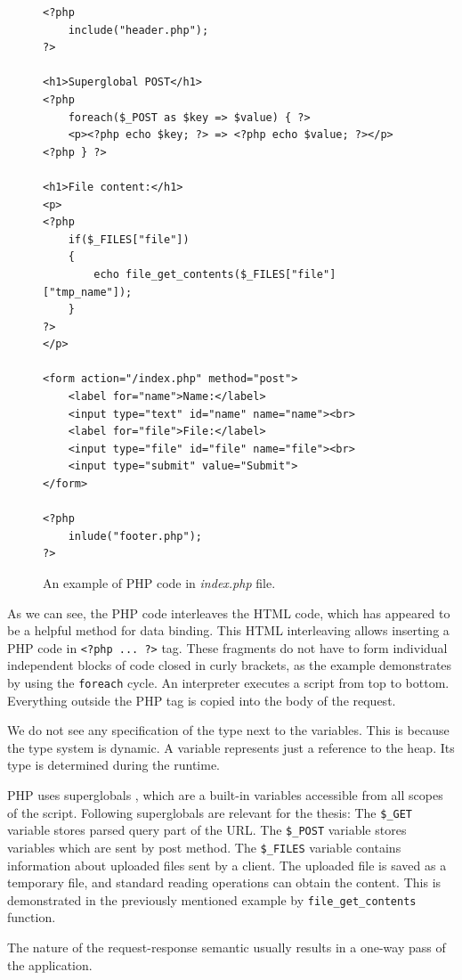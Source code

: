 \begin{figure}
\begin{lstlisting}
<?php
    include("header.php");
?>

<h1>Superglobal POST</h1>
<?php
    foreach($_POST as $key => $value) { ?>
    <p><?php echo $key; ?> => <?php echo $value; ?></p>
<?php } ?>

<h1>File content:</h1>
<p>
<?php 
    if($_FILES["file"])
    {
        echo file_get_contents($_FILES["file"]["tmp_name"]);
    }	
?>
</p>

<form action="/index.php" method="post">
    <label for="name">Name:</label>
    <input type="text" id="name" name="name"><br>
    <label for="file">File:</label>
    <input type="file" id="file" name="file"><br>
    <input type="submit" value="Submit">
</form>

<?php
    inlude("footer.php");
?>
\end{lstlisting}
\caption{An example of PHP code in \textit{index.php} file.}
\label{img01:php}
\end{figure}
\par
As we can see, the PHP code interleaves the HTML code, which has appeared to be a helpful method for data binding.
This HTML interleaving allows inserting a PHP code in \texttt{<?php ... ?>} tag.
These fragments do not have to form individual independent blocks of code closed in curly brackets, as the example demonstrates by using the \texttt{foreach} cycle.
An interpreter executes a script from top to bottom. Everything outside the PHP tag is copied into the body of the request.
\par
We do not see any specification of the type next to the variables.
This is because the type system is dynamic.
A variable represents just a reference to the heap.
Its type is determined during the runtime. 
\par
PHP uses superglobals \cite{online:phpManual}, which are a built-in variables accessible from all scopes of the script.
Following superglobals are relevant for the thesis:
The \texttt{\$\_GET} variable stores parsed query part of the URL.
The \texttt{\$\_POST} variable stores variables which are sent by post method.
The \texttt{\$\_FILES} variable contains information about uploaded files sent by a client.
The uploaded file is saved as a temporary file, and standard reading operations can obtain the content.
This is demonstrated in the previously mentioned example by \texttt{file\_get\_contents} function.
\par
The nature of the request-response semantic usually results in a one-way pass of the application.
